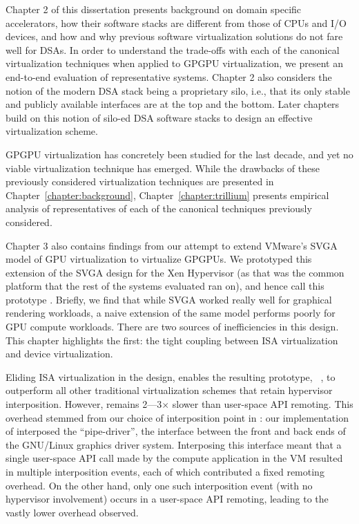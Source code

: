 Chapter 2 of this dissertation presents background on domain specific
accelerators, how their software stacks are different from those of CPUs and
I/O devices, and how and why previous software virtualization solutions do not
fare well for DSAs. In order to understand the trade-offs with each of the
canonical virtualization techniques when applied to GPGPU virtualization, we
present an end-to-end evaluation of representative systems. Chapter 2 also
considers the notion of the modern DSA stack being a proprietary silo, i.e.,
that its only stable and publicly available interfaces are at the top and the
bottom. Later chapters build on this notion of silo-ed DSA software stacks to
design an effective virtualization scheme.


GPGPU virtualization has concretely been studied for the last decade, and yet
no viable virtualization technique has emerged. While the drawbacks of
these previously considered virtualization techniques are presented in
Chapter~\ref{chapter:background}, Chapter~\ref{chapter:trillium} presents
empirical analysis of representatives of each of the canonical techniques
previously considered.

Chapter 3 also contains findings from our attempt to extend VMware's SVGA model
of GPU virtualization to virtualize GPGPUs. We prototyped this extension of the
SVGA design for the Xen Hypervisor (as that was the common platform that the
rest of the systems evaluated ran on), and hence call this prototype \XenSVGA.
Briefly, we find that while SVGA worked really well for graphical rendering
workloads, a naive extension of the same model performs poorly for GPU compute
workloads. There are two sources of inefficiencies in this design. This chapter
highlights the first: the tight coupling between ISA virtualization and device
virtualization.

Eliding ISA virtualization in the \XenSVGA design, enables the resulting
prototype, \Trillium~\cite{trillium}, to outperform all other traditional
virtualization schemes that retain hypervisor interposition.
However, \Trillium remains 2---3$\times$ slower than user-space API
remoting. This overhead stemmed from our choice of interposition point in
\Trillium: our implementation of \Trillium interposed the ``pipe-driver'', the
interface between the front and back ends of the GNU/Linux graphics driver
system. Interposing this interface meant that a single user-space API call made
by the compute application in the VM resulted in multiple interposition events,
each of which contributed a fixed remoting overhead. On the other hand, only
one such interposition event (with no hypervisor involvement) occurs in a
user-space API remoting, leading to the vastly lower overhead observed.

